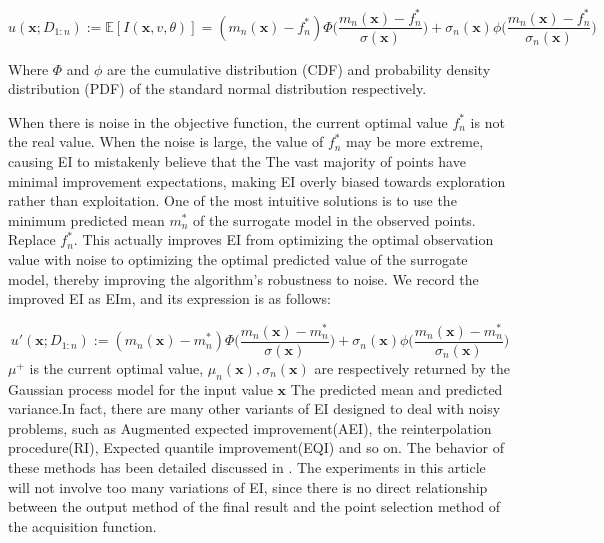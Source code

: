 \documentclass{article}
\begin{document}
\begin{equation}\label{eq7}
	u(\textbf{x};D_{1:n}):=\mathbb{E}[\textit{I}(\textbf{x},v,\theta)]=(m_n(\textbf{x})-f^*_n)\Phi \Big(\frac{m_n(\textbf{x})-f^*_n}{\sigma(\textbf{x})}\Big)+\sigma_n(\textbf{x})\phi \Big(\frac{m_n(\textbf{x})-f^*_n}{\sigma_n(\textbf{x})} \Big)
\end{equation}

Where $\Phi$ and $\phi$ are the cumulative distribution (CDF) and probability density distribution (PDF) of the standard normal distribution respectively.

\hspace{2em}When there is noise in the objective function, the current optimal value $f^*_n$ is not the real value. When the noise is large, the value of $f^*_n$ may be more extreme, causing EI to mistakenly believe that the
The vast majority of points have minimal improvement expectations, making EI overly biased towards exploration rather than exploitation. One of the most intuitive solutions is to use the minimum predicted mean $m^*_n$ of the surrogate model in the observed points.
Replace $f^*_n$. This actually improves EI from optimizing the optimal observation value with noise to optimizing the optimal predicted value of the surrogate model, thereby improving the algorithm's robustness to noise. We record the improved EI as EIm, and its expression is as follows:

\begin{equation}\label{eq8}
	u'(\textbf{x};D_{1:n}):=(m_n(\textbf{x})-m^*_n)\Phi \Big(\frac{m_n(\textbf{x})-m^*_n}{\sigma(\textbf{x})}\Big)+\sigma_n(\textbf{x})\phi \Big(\frac{m_n(\textbf{x})-m^*_n}{\sigma_n(\textbf{x})} \Big)
\end{equation}
$\mu^+$ is the current optimal value, $\mu_n(\textbf{x}),\sigma_n(\textbf{x})$ are respectively returned by the Gaussian process model for the input value $\textbf{x}$ The predicted mean and predicted variance.In fact, there are many other variants of EI designed to deal with noisy problems, such as Augmented expected improvement(AEI)\citep{Huang2006Global}, the reinterpolation procedure(RI)\citep{Forrester2006Design}, Expected quantile improvement(EQI)\citep{Picheny2012Quantile} and so on. The behavior of these methods has been detailed discussed in \citep{Picheny2013benchmark}. The experiments in this article will not involve too many variations of EI, since there is no direct relationship between the output method of the final result and the point selection method of the acquisition function.
\end{document}
